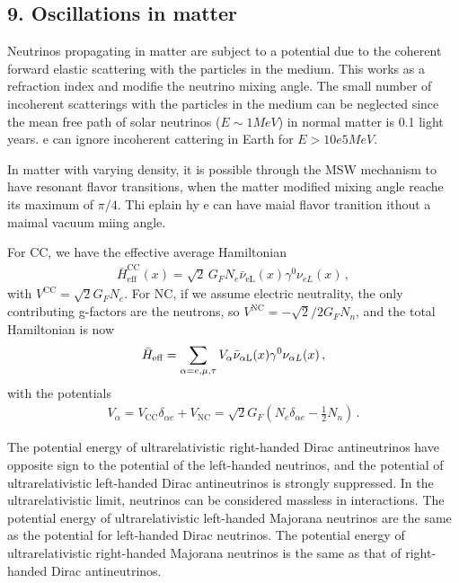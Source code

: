 \documentclass[twocolumn]{article}
\newcommand{\n}[1]{\ensuremath{\nu_{#1}}}
\newcommand{\an}[1]{\ensuremath{\bar{\nu}_{\text{#1}}}}
\renewcommand{\a}{\ensuremath{\alpha}}
\begin{document}
\subsection*{9. Oscillations in matter}
Neutrinos propagating in matter are subject to a potential due to the coherent forward elastic scattering with the particles in the medium. This works as a refraction index and modifie the neutrino mixing angle. The small number of incoherent scatterings with the particles in the medium can be neglected since the mean free path of solar neutrinos ($E \sim \si{1}{MeV} $) in normal matter is 0.1 light years. e can ignore incoherent cattering in Earth for $E > \si{10e5}{MeV}$. 

In matter with varying density, it is possible through the MSW mechanism to have resonant flavor transitions, when the matter modified mixing angle reache its maximum of $\pi /4$. Thi eplain hy e can have maial flavor tranition ithout a maimal vacuum miing angle.

For CC, we have the effective average Hamiltonian
\begin{align*}
  \bar{H}^\text{CC}_\text{eff}(x) = \sqrt{2}\, G_F N_e \an{eL}(x) \gamma^0 \n{eL}(x)      
\,,\end{align*}
with $V^\text{CC} = \sqrt{2}G_F N_e $. For NC, if we assume electric neutrality, the only contributing g-factors are the neutrons, so $V^\text{NC} = -\sqrt{2}/2 G_F N_n$, and the total Hamiltonian is now
\begin{align*}
  \bar{H}_\text{eff} = \sum_{\a = e, \mu, \tau} V_\a \an{\a L}(x) \gamma^0 \n{\a L}(x)
\,,\end{align*}
with the potentials
\begin{align*}
  V_\a = V_\text{CC} \delta_{\a e} + V_\text{NC} = \sqrt{2} G_F \left( N_e \delta_{\a e} - \frac{1}{2} N_n \right) 
\,.\end{align*}

The potential energy of ultrarelativistic right-handed Dirac antineutrinos have opposite sign to the potential of the left-handed neutrinos, and the potential of ultrarelativistic left-handed Dirac antineutrinos is strongly suppressed.
In the ultrarelativistic limit, neutrinos can be considered massless in interactions. The potential energy of ultrarelativistic left-handed Majorana neutrinos are the same as the potential for left-handed Dirac neutrinos. The potential energy of ultrarelativistic right-handed Majorana neutrinos is the same as that of right-handed Dirac antineutrinos.
\end{document}
